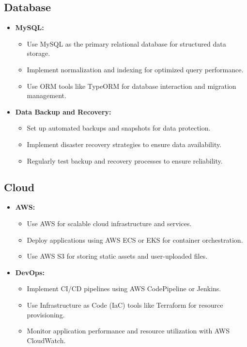 \subsection{Database}
\begin{itemize}[leftmargin=*]
    \item \textbf{MySQL:}
    \begin{itemize}
        \item Use MySQL as the primary relational database for structured data storage.
        \item Implement normalization and indexing for optimized query performance.
        \item Use ORM tools like TypeORM for database interaction and migration management.
    \end{itemize}
    
    \item \textbf{Data Backup and Recovery:}
    \begin{itemize}
        \item Set up automated backups and snapshots for data protection.
        \item Implement disaster recovery strategies to ensure data availability.
        \item Regularly test backup and recovery processes to ensure reliability.
    \end{itemize}
\end{itemize}

\subsection{Cloud}
\begin{itemize}[leftmargin=*]
    \item \textbf{AWS:}
    \begin{itemize}
        \item Use AWS for scalable cloud infrastructure and services.
        \item Deploy applications using AWS ECS or EKS for container orchestration.
        \item Use AWS S3 for storing static assets and user-uploaded files.
    \end{itemize}
    
    \item \textbf{DevOps:}
    \begin{itemize}
        \item Implement CI/CD pipelines using AWS CodePipeline or Jenkins.
        \item Use Infrastructure as Code (IaC) tools like Terraform for resource provisioning.
        \item Monitor application performance and resource utilization with AWS CloudWatch.
    \end{itemize}
\end{itemize}

